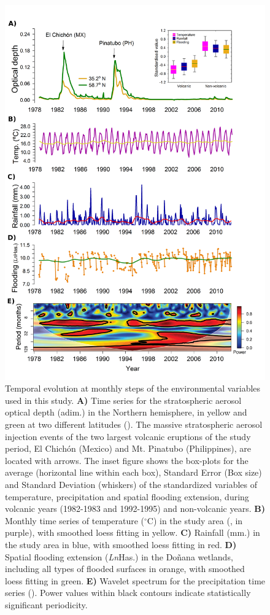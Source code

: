 \documentclass[12pt]{article}
\begin{document}
	\begin{figure}[t]
		\centering
		\includegraphics[width=0.6\linewidth]{processed_figs/Environ_clim_ts}
		\caption[Environmental and stratospheric aerosol optical depth time series]{Temporal evolution at monthly steps of the environmental variables used in this study. \textbf{A)} Time series for the stratospheric aerosol optical depth (adim.) in the Northern hemisphere, in yellow and green at two different latitudes (\cite{Booth2012}). The massive stratospheric aerosol injection events of the two largest volcanic eruptions of the study period, El Chichón (Mexico) and Mt. Pinatubo (Philippines), are located with arrows. The inset figure shows the box-plots for the average (horizontal line within each box), Standard Error (Box size) and Standard Deviation (whiskers) of the standardized variables of temperature, precipitation and spatial flooding extension, during volcanic years (1982-1983 and 1992-1995) and non-volcanic years. \textbf{B)} Monthly time series of temperature ($^\circ \mathrm{C}$) in the study area (\cite{Almaraz2012}, in purple), with smoothed loess fitting in yellow. \textbf{C)} Rainfall (mm.) in the study area in blue, with smoothed loess fitting in red. \textbf{D)} Spatial flooding extension (\textit{Ln}Has.) in the Doñana wetlands, including all types of flooded surfaces in orange, with smoothed loess fitting in green. \textbf{E)} Wavelet spectrum for the precipitation time series (\cite{Cazelles2008}). Power values within black contours indicate statistically significant periodicity.}
		\label{fig:StructChanFullDoniana}
	\end{figure}
\end{document}
